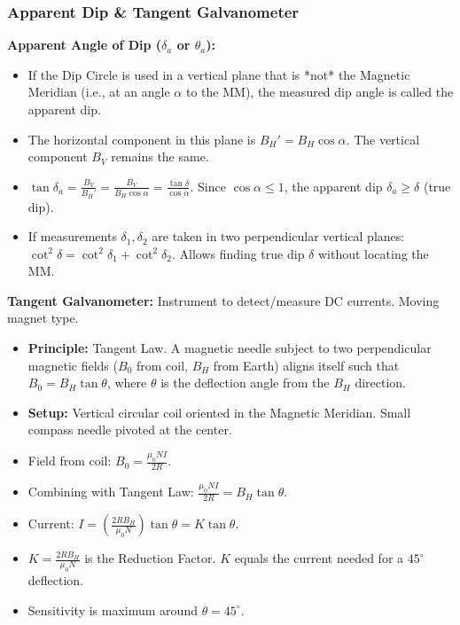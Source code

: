 \begin{frame}[t]
    \frametitle{\textcolor{deepnavy}{\textbf{Apparent Dip & Tangent Galvanometer}}}
    \renewcommand{\familydefault}{\rmdefault}
    \small

      \item<+-> \textbf{Apparent Angle of Dip ($\delta_a$ or $\theta_a$):}
        \begin{itemize}[<+->]
              \item If the Dip Circle is used in a vertical plane that is *not* the Magnetic Meridian (i.e., at an angle $\alpha$ to the MM), the measured dip angle is called the apparent dip.
              \item The horizontal component in this plane is $B_H' = B_H \cos\alpha$. The vertical component $B_V$ remains the same.
              \item $\tan\delta_a = \frac{B_V}{B_H'} = \frac{B_V}{B_H \cos\alpha} = \frac{\tan\delta}{\cos\alpha}$. Since $\cos\alpha \le 1$, the apparent dip $\delta_a \ge \delta$ (true dip).
              \item If measurements $\delta_1, \delta_2$ are taken in two perpendicular vertical planes: $\cot^2\delta = \cot^2\delta_1 + \cot^2\delta_2$.   Allows finding true dip $\delta$ without locating the MM.
        \end{itemize}

      \item<+-> \textbf{Tangent Galvanometer:} Instrument to detect/measure DC currents.   Moving magnet type.
        \begin{itemize}[<+->]
            \item \textbf{Principle:} Tangent Law.   A magnetic needle subject to two perpendicular magnetic fields ($B_0$ from coil, $B_H$ from Earth) aligns itself such that $B_0 = B_H \tan\theta$, where $\theta$ is the deflection angle from the $B_H$ direction.
            \item \textbf{Setup:} Vertical circular coil oriented in the Magnetic Meridian.   Small compass needle pivoted at the center.
              \item Field from coil: $B_0 = \frac{\mu_0 NI}{2R}$.
              \item Combining with Tangent Law: $\frac{\mu_0 NI}{2R} = B_H \tan\theta$.
              \item Current: $I = \left( \frac{2R B_H}{\mu_0 N} \right) \tan\theta = K \tan\theta$.
              \item $K = \frac{2R B_H}{\mu_0 N}$ is the Reduction Factor.   $K$ equals the current needed for a $45^\circ$ deflection.
              \item Sensitivity is maximum around $\theta = 45^\circ$.
        \end{itemize}
\end{frame}

